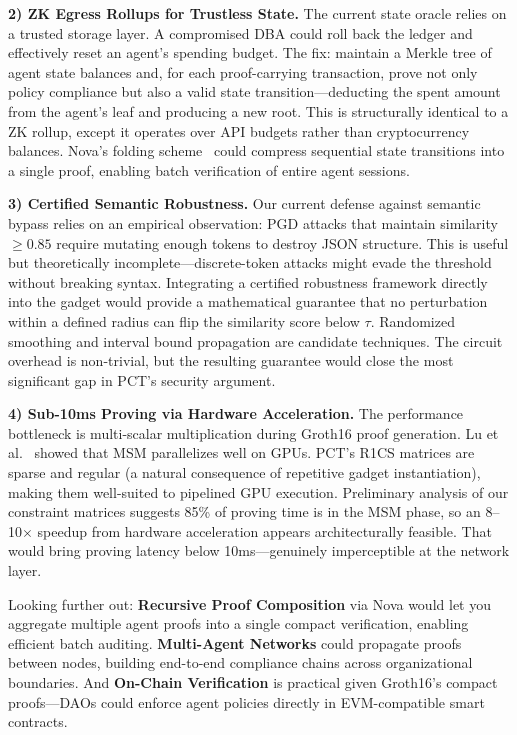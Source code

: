 \documentclass[10pt,conference]{IEEEtran}
\begin{document}
\textbf{2) ZK Egress Rollups for Trustless State.} The current state oracle relies on a trusted storage layer. A compromised DBA could roll back the ledger and effectively reset an agent's spending budget. The fix: maintain a Merkle tree of agent state balances and, for each proof-carrying transaction, prove not only policy compliance but also a valid state transition---deducting the spent amount from the agent's leaf and producing a new root. This is structurally identical to a ZK rollup, except it operates over API budgets rather than cryptocurrency balances. Nova's folding scheme~\cite{kothapalli2022nova} could compress sequential state transitions into a single proof, enabling batch verification of entire agent sessions.

\textbf{3) Certified Semantic Robustness.} Our current defense against semantic bypass relies on an empirical observation: PGD attacks that maintain similarity $\geq 0.85$ require mutating enough tokens to destroy JSON structure. This is useful but theoretically incomplete---discrete-token attacks might evade the threshold without breaking syntax. Integrating a certified robustness framework directly into the gadget would provide a mathematical guarantee that no perturbation within a defined radius can flip the similarity score below $\tau$. Randomized smoothing and interval bound propagation are candidate techniques. The circuit overhead is non-trivial, but the resulting guarantee would close the most significant gap in PCT's security argument.

\textbf{4) Sub-10ms Proving via Hardware Acceleration.} The performance bottleneck is multi-scalar multiplication during Groth16 proof generation. Lu et al.~\cite{lu2024pipemsm} showed that MSM parallelizes well on GPUs. PCT's R1CS matrices are sparse and regular (a natural consequence of repetitive gadget instantiation), making them well-suited to pipelined GPU execution. Preliminary analysis of our constraint matrices suggests 85\% of proving time is in the MSM phase, so an 8--10$\times$ speedup from hardware acceleration appears architecturally feasible. That would bring proving latency below 10ms---genuinely imperceptible at the network layer.

Looking further out: \textbf{Recursive Proof Composition} via Nova would let you aggregate multiple agent proofs into a single compact verification, enabling efficient batch auditing. \textbf{Multi-Agent Networks} could propagate proofs between nodes, building end-to-end compliance chains across organizational boundaries. And \textbf{On-Chain Verification} is practical given Groth16's compact proofs---DAOs could enforce agent policies directly in EVM-compatible smart contracts.
\end{document}

